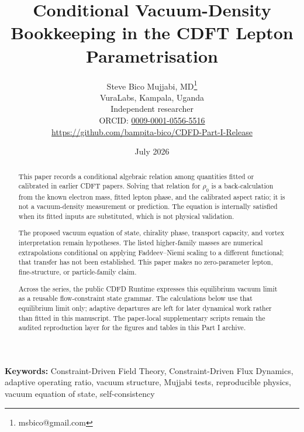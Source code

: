 \documentclass[11pt]{article}
\begin{document}
\title{Conditional Vacuum-Density Bookkeeping in the CDFT Lepton Parametrisation}

\author{Steve Bico Mujjabi, MD\thanks{msbico@gmail.com}\\
VuraLabs, Kampala, Uganda\\
Independent researcher\\
ORCID: \href{https://orcid.org/0009-0001-0556-5516}{0009-0001-0556-5516}\\
\url{https://github.com/bampita-bico/CDFD-Part-I-Release}}

\date{July 2026}

\maketitle

\begin{abstract}
This paper records a conditional algebraic relation among quantities fitted or
calibrated in earlier CDFT papers. Solving that relation for $\rho_0$ is a
back-calculation from the known electron mass, fitted lepton phase, and the
calibrated aspect ratio; it is not a vacuum-density measurement or prediction.
The equation is internally satisfied when its fitted inputs are substituted,
which is not physical validation.

The proposed vacuum equation of state, chirality phase, transport capacity, and
vortex interpretation remain hypotheses. The listed higher-family masses are
numerical extrapolations conditional on applying Faddeev--Niemi scaling to a
different functional; that transfer has not been established. This paper makes
no zero-parameter lepton, fine-structure, or particle-family claim.

Across the series, the public CDFD Runtime expresses this equilibrium vacuum
limit as a reusable flow-constraint state grammar. The calculations below use
that equilibrium limit only; adaptive departures are left for later dynamical
work rather than fitted in this manuscript. The paper-local supplementary
scripts remain the audited reproduction layer for the figures and tables in
this Part I archive.
\end{abstract}

\noindent\textbf{Keywords:} Constraint-Driven Field Theory, Constraint-Driven Flux Dynamics, adaptive operating ratio, vacuum structure, Mujjabi tests, reproducible physics, vacuum equation of state, self-consistency

\vspace{0.75em}
\linenumbers
\end{document}
